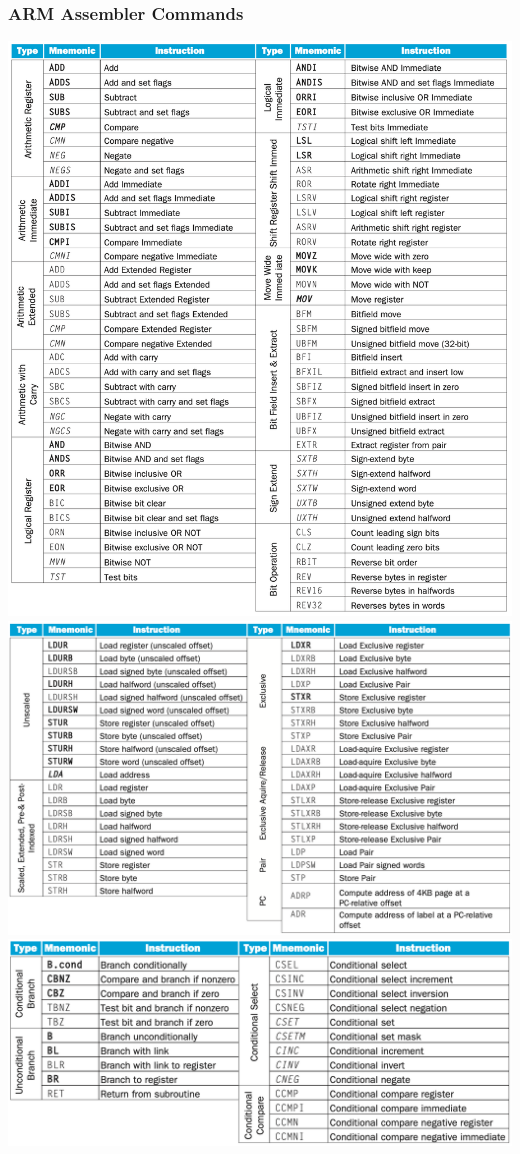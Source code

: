 \documentclass[a4paper]{scrartcl}
\begin{document}
        \subsubsection{ARM Assembler Commands}
        \centering\includegraphics[scale=0.25]{arm_assembler1}
        \centering\includegraphics[scale=0.25]{arm_assembler2}
        \centering\includegraphics[scale=0.3]{arm_assembler3} 
\end{document}
